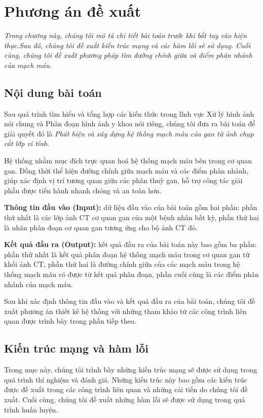 \chapter{Phương án đề xuất}
\label{chap:phuong_an_de_xuat}
	\textit{Trong chương này, chúng tôi mô tả chi tiết bài toán trước khi bắt tay vào hiện thực.\linebreak Sau đó, chúng tôi đề xuất kiến trúc mạng và các hàm lỗi sẽ sử dụng. Cuối cùng, chúng tôi đề xuất phương pháp tìm đường chính giữa và điểm phân nhánh của mạch máu.}
\minitoc

\section{Nội dung bài toán} 
\label{sec:noi_dung_bai_toan}
	Sau quá trình tìm hiểu và tổng hợp các kiến thức trong lĩnh vực Xử lý hình ảnh nói chung và Phân đoạn hình ảnh y khoa nói riêng, chúng tôi đưa ra bài toán để giải quyết đó là \textit{Phát hiện và xây dựng hệ thống mạch máu của gan từ ảnh chụp cắt lớp vi tính.}
	
	Hệ thống nhằm mục đích trực quan hoá hệ thống mạch máu bên trong cơ quan gan. Đồng thời thể hiện đường chính giữa mạch máu và các điểm phân nhánh, giúp xác định vị trí tương quan giữa các phân thuỳ gan, hỗ trợ công tác giải phẫu được tiến hành nhanh chóng và an toàn hơn.
	
	\textbf{Thông tin đầu vào (Input):} dữ liệu đầu vào của bài toán gồm hai phần: phần thứ nhất là các lớp ảnh CT cơ quan gan của một bệnh nhân bất kỳ, phần thứ hai là nhãn phân đoạn cơ quan gan tương ứng cho bộ ảnh CT đó.
	
	\textbf{Kết quả đầu ra (Output):} kết quả đầu ra của bài toán này bao gồm ba phần: phần thứ nhất là kết quả phân đoạn hệ thống mạch máu trong cơ quan gan từ khối ảnh CT, phần thứ hai là đường chính giữa của các mạch máu trong hệ thống mạch máu có được từ kết quả phân đoạn, phần cuối cùng là các điểm phân nhánh của mạch máu.
	
	Sau khi xác định thông tin đầu vào và kết quả đầu ra của bài toán, chúng tôi đề xuất phương án thiết kế hệ thống với những tham khảo từ các công trình liên quan được trình bày trong phần tiếp theo.

\section{Kiến trúc mạng và hàm lỗi} 
\label{sec:kien_truc_mang_va_ham_loi}
	Trong mục này, chúng tôi trình bày những kiến trúc mạng sẽ được sử dụng trong quá trình thí nghiệm và đánh giá. Những kiến trúc này bao gồm các kiến trúc được đề xuất trong các công trình liên quan và những cải tiến do chúng tôi đề xuất. Cuối cùng, chúng tôi đề xuất những hàm lỗi sẽ được sử dụng trong quá trình huấn luyện.
	

